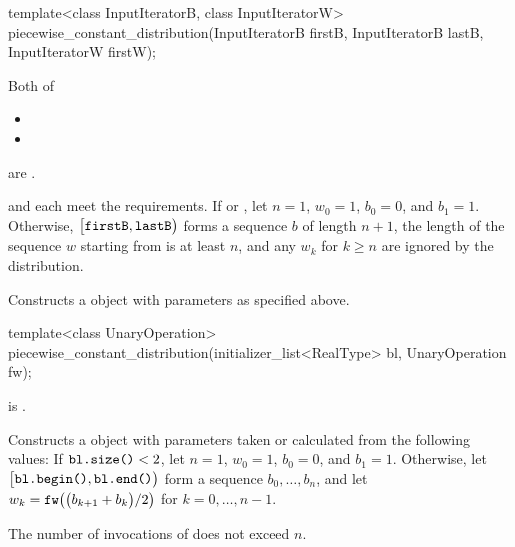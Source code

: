 %
\begin{itemdecl}
template<class InputIteratorB, class InputIteratorW>
  piecewise_constant_distribution(InputIteratorB firstB, InputIteratorB lastB,
                                  InputIteratorW firstW);
\end{itemdecl}

\begin{itemdescr}
\pnum
\mandates
Both of
\begin{itemize}
\item{}
\item{}
\end{itemize}
are .

\pnum
\expects
   and 
   each meet the
   requirements.
 If 
 or ,
 let $n = 1$,
     $w_0 = 1$,
     $b_0 = 0$,
 and $b_1 = 1$.
 Otherwise,
 $\bigl[\texttt{\protect firstB}, \texttt{\protect lastB}\bigr)$
 forms a sequence $b$ of length $n+1$,
 the length of the sequence $w$ starting from 
 is at least $n$,
 and any $w_k$ for  $k \geq n$ are ignored by the distribution.

\pnum
\effects
Constructs a  object
 with parameters as specified above.
\end{itemdescr}


%
\begin{itemdecl}
template<class UnaryOperation>
  piecewise_constant_distribution(initializer_list<RealType> bl, UnaryOperation fw);
\end{itemdecl}

\begin{itemdescr}
\pnum
\mandates
{} is .

\pnum
\effects
Constructs a  object
 with parameters taken or calculated
 from the following values:
 If $\texttt{\protect bl.size()} < 2$,
 let $n = 1$,
     $w_0 = 1$,
     $b_0 = 0$,
 and $b_1 = 1$.
 Otherwise,
 let $\bigl[\texttt{\protect bl.begin()}, \texttt{\protect bl.end()}\bigr)$
 form a sequence $b_0, \dotsc, b_n$,
 and
 let $w_k = \texttt{\protect fw}\bigl(\bigl(b_{k+1} + b_k\bigr) / 2\bigr)$
 for $k = 0, \dotsc, n - 1$.

\pnum
\complexity
The number of invocations of  does not exceed $n$.
\end{itemdescr}


